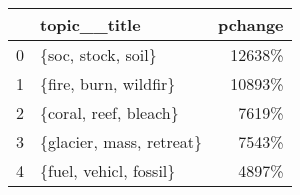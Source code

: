 \begin{tabular}{llr}
\toprule
{} &              topic\_\_title &  pchange \\
\midrule
0 &        \{soc, stock, soil\} &   12638\% \\
1 &     \{fire, burn, wildfir\} &   10893\% \\
2 &     \{coral, reef, bleach\} &    7619\% \\
3 &  \{glacier, mass, retreat\} &    7543\% \\
4 &    \{fuel, vehicl, fossil\} &    4897\% \\
\bottomrule
\end{tabular}
